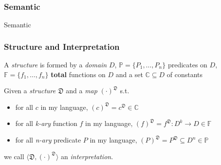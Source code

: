 \documentclass{beamer}
\begin{document}
            \subsubsection{Semantic}
                \begin{frame}
                    \vspace*{1cm}
                    \begin{center}
                        \begin{Huge}
                            \textcolor{title_blue}{Semantic}
                        \end{Huge}
                    \end{center}
                \end{frame}

                \begin{frame}
                    \frametitle{Structure and Interpretation}
                    \begin{definition}[Structure]
                        A \textit{structure} is formed by a \textit{domain} $ D $, $\mathbb{P} = \{ P_1, \dots, P_n \} $ predicates on $ D $, $ \mathbb{F} = \{ f_1, \dots, f_n \} $ \textbf{total} functions on $ D $ and a set $ \mathbb{C} \subseteq D $ of constants
                    \end{definition}
                    \begin{definition}[Interpretation]
                        Given a \textit{structure} $ \mathfrak{D} $ and a \textit{map} $ (\cdot)^{\mathfrak{D}} $ s.t.
                        \begin{itemize}
                            \item for all $ c $ in my language, $ (c)^\mathfrak{D} = c^\mathfrak{D} \in \mathbb{C} $
                            \item for all \textit{k-ary} function $ f $ in my language, $ (f)^\mathfrak{D} = f^\mathfrak{D}: D^k \to D \in \mathbb{F} $
                            \item for all \textit{n-ary} predicate $ P $ in my language, $ (P)^\mathfrak{D} = P^\mathfrak{D} \subseteq D^n \in \mathbb{P} $
                        \end{itemize}
                        we call $ \langle \mathfrak{D}, (\cdot)^{\mathfrak{D}} \rangle $ an \textit{interpretation}.
                    \end{definition}

                \end{frame}
\end{document}
